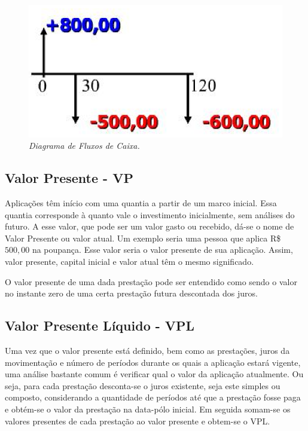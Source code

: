 \begin{figure}[!h]
 \centering
 \includegraphics[scale=0.8]{fluxo.eps}
 \caption{\it Diagrama de Fluxos de Caixa.} \label{fluxo}
\end{figure}

\subsection{Valor Presente - VP}

Aplicações têm início com uma quantia a partir de um marco inicial. Essa quantia corres\-ponde à quanto vale o investimento inicialmente, sem análises do futuro. A esse valor, que pode ser um valor gasto ou recebido, dá-se o nome de Valor Presente ou valor atual. Um exemplo seria uma pessoa que aplica R\$ $500,00$ na poupança. Esse valor seria o valor presente de sua aplicação. Assim, valor presente, capital inicial e valor atual têm o mesmo significado.

O valor presente de uma dada prestação pode ser entendido como sendo o valor no ins\-tante zero de uma certa prestação futura descontada dos juros.

\subsection{Valor Presente Líquido - VPL}

Uma vez que o valor presente está definido, bem como as prestações, juros da movimentação e número de períodos durante os quais a aplicação estará vigente, uma análise bastante comum é verificar qual o valor da aplicação atualmente. Ou seja, para cada prestação desconta-se o juros existente, seja este simples ou composto, considerando a quantidade de períodos até que a prestação fosse paga e obtém-se o valor da prestação na data-pólo inicial. Em seguida somam-se os valores presentes de cada prestação ao valor presente e obtem-se o VPL.

